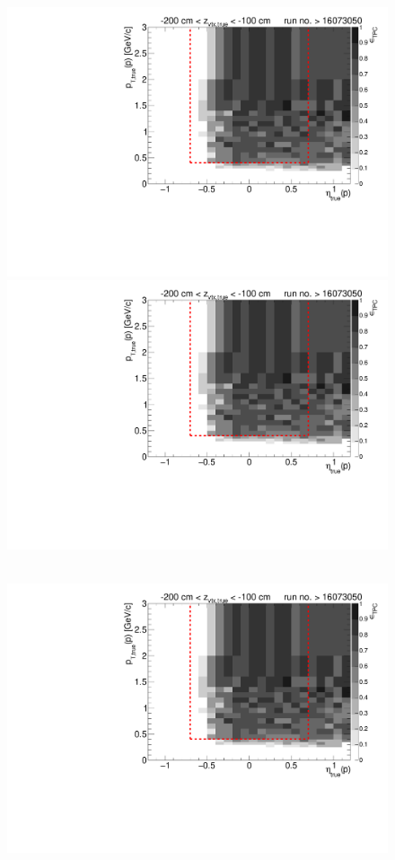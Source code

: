 \begin{figure}[hb]
{		\includegraphics[width=\linewidth,page=7]{graphics/eff/Eff2D_TPC_proton_Minus_RunRange2.pdf}\\
		\includegraphics[width=\linewidth,page=9]{graphics/eff/Eff2D_TPC_proton_Minus_RunRange2.pdf}
	}~
	\parbox{0.495\textwidth}{
		\centering
		\includegraphics[width=\linewidth,page=4]{graphics/eff/Eff2D_TPC_proton_Minus_RunRange2.pdf}\\
}
\end{figure}
